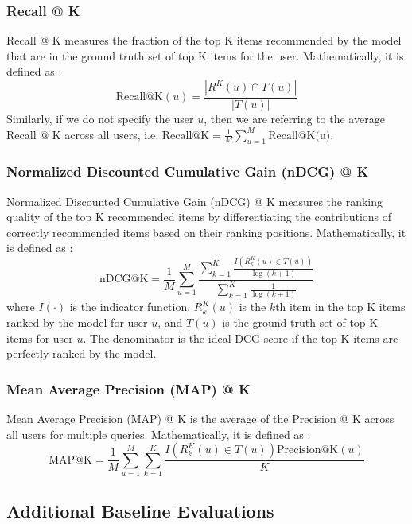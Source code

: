 \documentclass{article}
\begin{document}
\subsubsection{Recall @ K}

Recall @ K measures the fraction of the top K items recommended by the model that are in the ground truth set of top K items for the user. Mathematically, it is defined as \cite{survey}:
$$
\mbox{Recall@K}(u) = \frac{| R^K(u) \cap T(u) |}{|T(u)|}
$$
Similarly, if we do not specify the user $u$, then we are referring to the average Recall @ K across all users, i.e. $\mbox{Recall@K} = \frac{1}{M} \sum_{u = 1}^M \mbox{Recall@K(u)}$.

\subsubsection{Normalized Discounted Cumulative Gain (nDCG) @ K}

Normalized Discounted Cumulative Gain (nDCG) @ K measures the ranking quality of the top K recommended items by differentiating the contributions of correctly recommended items based on their ranking positions. Mathematically, it is defined as \cite{survey}:
$$
\mbox{nDCG@K} = \frac{1}{M} \sum_{u = 1}^M \frac{\sum_{k = 1}^K \frac{I(R^K_k(u) \in T(u))}{\log(k + 1)}}{\sum_{k = 1}^K \frac{1}{ \log(k + 1)}}
$$
where $I(\cdot)$ is the indicator function, $R^K_k(u)$ is the $k$th item in the top K items ranked by the model for user $u$, and $T(u)$ is the ground truth set of top K items for user $u$. The denominator is the ideal DCG score if the top K items are perfectly ranked by the model.

\subsubsection{Mean Average Precision (MAP) @ K}

Mean Average Precision (MAP) @ K is the average of the Precision @ K across all users for multiple queries. Mathematically, it is defined as \cite{survey}:
$$
\mbox{MAP@K} = \frac{1}{M} \sum_{u = 1}^M \sum_{k = 1}^K \frac{I(R^K_k(u) \in T(u)) \mbox{Precision@K}(u)}{K}
$$


\subsection{Additional Baseline Evaluations} \label{additional-baseline-eval}
\end{document}
